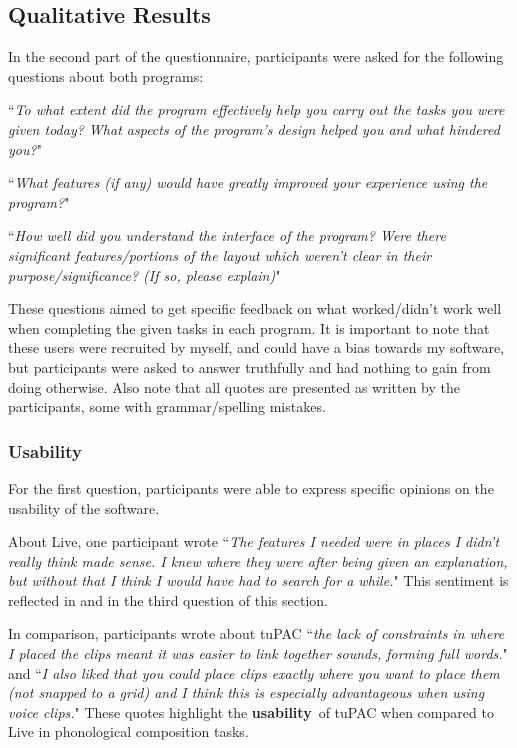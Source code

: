 \documentclass[12pt,a4paper,oneside,openright]{report}
\newcommand{\usability}{\textbf{usability}}
\newcommand{\quoteT}[1]{``\textit{#1}"}
\begin{document}
\subsection{Qualitative Results}
In the second part of the questionnaire, participants were asked for the following questions about both programs:

\quoteT{To what extent did the program effectively help you carry out the tasks you were given today? What aspects of the program's design helped you and what hindered you?}

\quoteT{What features (if any) would have greatly improved your experience using the program?}

\quoteT{How well did you understand the interface of the program? Were there significant features/portions of the layout which weren't clear in their purpose/significance? (If so, please explain)}

These questions aimed to get specific feedback on what worked/didn't work well when completing the given tasks in each program. It is important to note that these users were recruited by myself, and could have a bias towards my software, but participants were asked to answer truthfully and had nothing to gain from doing otherwise. Also note that all quotes are presented as written by the participants, some with grammar/spelling mistakes.

\subsubsection{Usability}
For the first question, participants were able to express specific opinions on the usability of the software. 

About Live, one participant wrote \quoteT{The features I needed were in places I didn’t really think made sense. I knew where they were after being given an explanation, but without that I think I would have had to search for a while.} This sentiment is reflected in  and in the third question of this section. 

In comparison, participants wrote about tuPAC \quoteT{the lack of constraints in where I placed the clips meant it was easier to link together sounds, forming full words.} and \quoteT{I also liked that you could place clips exactly where you want to place them (not snapped to a grid) and I think this is especially advantageous when using voice clips.} These quotes highlight the \usability\ of tuPAC when compared to Live in phonological composition tasks.
\end{document}
